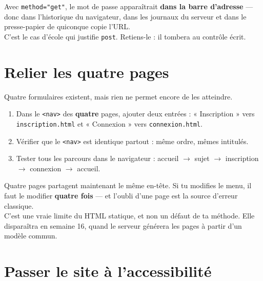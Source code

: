 \documentclass[a4paper,11pt]{article}
\begin{document}
\begin{tcolorbox}[astuce, title={Pourquoi \texttt{method="post"} ici, sans discussion}]
Avec \texttt{method="get"}, le mot de passe apparaîtrait \textbf{dans la barre d'adresse} --- donc dans l'historique du navigateur, dans les journaux du serveur et dans le presse-papier de quiconque copie l'URL.\\[4pt]
C'est le cas d'école qui justifie \texttt{post}. Retiens-le : il tombera au contrôle écrit.
\end{tcolorbox}

\section{Relier les quatre pages}

Quatre formulaires existent, mais rien ne permet encore de les atteindre.

\begin{enumerate}
  \item Dans le \texttt{<nav>} des \textbf{quatre} pages, ajouter deux entrées : « Inscription » vers \texttt{inscription.html} et « Connexion » vers \texttt{connexion.html}.
  \item Vérifier que le \texttt{<nav>} est identique partout : même ordre, mêmes intitulés.
  \item Tester tous les parcours dans le navigateur : accueil $\rightarrow$ sujet $\rightarrow$ inscription $\rightarrow$ connexion $\rightarrow$ accueil.
\end{enumerate}

\begin{tcolorbox}[attention, title={Le copier-coller a une limite}]
Quatre pages partagent maintenant le même en-tête. Si tu modifies le menu, il faut le modifier \textbf{quatre fois} --- et l'oubli d'une page est la source d'erreur classique.\\[4pt]
C'est une vraie limite du HTML statique, et non un défaut de ta méthode. Elle disparaîtra en semaine 16, quand le serveur générera les pages à partir d'un modèle commun.
\end{tcolorbox}

\section{Passer le site à l'accessibilité}
\end{document}
